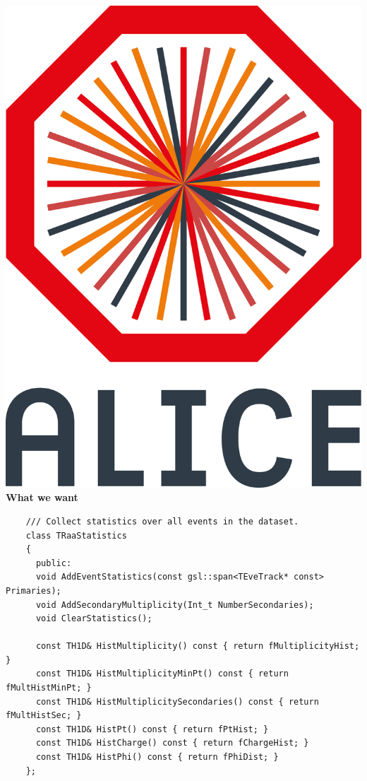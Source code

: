 \documentclass[aspectratio=1610,14pt,dvipsnames]{beamer}
\begin{document}
\begin{frame}[fragile]{\includegraphics[height=0.07\textheight]{2012-Jul-04-4_Color_Logo_CB.png} \hspace{0.2cm}\textbf{What we want}}
  \begin{verbatim}
    /// Collect statistics over all events in the dataset.
    class TRaaStatistics
    {
      public:
      void AddEventStatistics(const gsl::span<TEveTrack* const> Primaries);
      void AddSecondaryMultiplicity(Int_t NumberSecondaries);
      void ClearStatistics();

      const TH1D& HistMultiplicity() const { return fMultiplicityHist; }
      const TH1D& HistMultiplicityMinPt() const { return fMultHistMinPt; }
      const TH1D& HistMultiplicitySecondaries() const { return fMultHistSec; }
      const TH1D& HistPt() const { return fPtHist; }
      const TH1D& HistCharge() const { return fChargeHist; }
      const TH1D& HistPhi() const { return fPhiDist; }
    };
  \end{verbatim}
\end{frame}
\end{document}
